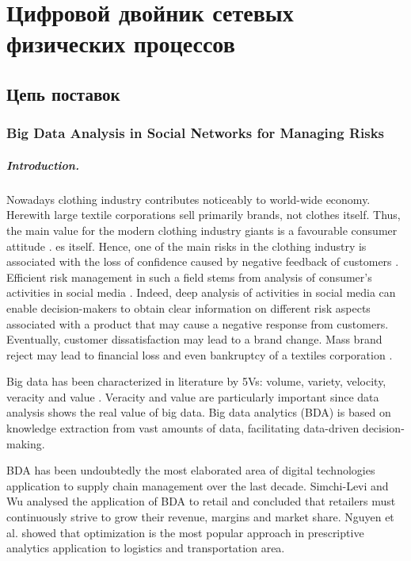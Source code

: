 \chapter{Цифровой двойник сетевых физических процессов}\label{ch:ch6}

\section{Цепь поставок}\label{sec:ch6/sect1}

\subsection{Big Data Analysis in Social Networks for Managing Risks}\label{subsec:ch6/sec1/sub1}

\paragraph{Introduction.} Nowadays clothing industry contributes noticeably to world-wide economy. Herewith large textile corporations sell primarily brands, not clothes itself. Thus, the main value for the modern clothing industry giants is a favourable consumer attitude \cite{Choi}. es itself. Hence, one of the main risks in the clothing industry is associated with the loss of confidence caused by negative feedback of customers \cite{IvanovDolguiSokolovIvanova,ChiuChoiDai}. Efficient risk management in such a field stems from analysis of consumer’s activities in social media \cite{Choi}. Indeed, deep analysis of activities in social media can enable decision-makers to obtain clear information on different risk aspects associated with a product that may cause a negative response from customers. Eventually, customer dissatisfaction may lead to a brand change. Mass brand reject may lead to financial loss and even bankruptcy of a textiles corporation \cite{TianChoiDing}.

Big data has been characterized in literature by 5Vs: volume, variety, velocity, veracity and value \cite{GunasekaranTiwariDubey}. Veracity and value are particularly important since data analysis shows the real value of big data. Big data analytics (BDA) is based on knowledge extraction from vast amounts of data, facilitating data-driven decision-making.

BDA has been undoubtedly the most elaborated area of digital technologies application to supply chain management over the last decade. Simchi-Levi and Wu \cite{SimchiLeviWu} analysed the application of BDA to retail and concluded that retailers must continuously strive to grow their revenue, margins and market share. Nguyen et al. \cite{NguyenZhouSpiegler} showed that optimization is the most popular approach in prescriptive analytics application to logistics and transportation area.

